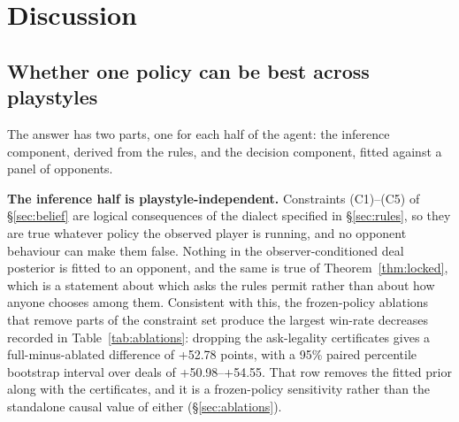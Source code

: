 \documentclass[11pt]{article}
\theoremstyle{definition}
\newcommand{\numAblSinkhorn}{+52.78}
\newcommand{\numAblSinkhornCI}{+50.98--+54.55}
\begin{document}
\renewcommand{\topfraction}{0.7}
\renewcommand{\bottomfraction}{0.3}
\renewcommand{\textfraction}{0.2}
\renewcommand{\floatpagefraction}{0.5}
\setcounter{topnumber}{2}
\setcounter{bottomnumber}{1}
\setcounter{totalnumber}{3}
\setlength{\textfloatsep}{20pt plus 2pt minus 4pt}
\setlength{\floatsep}{12pt plus 2pt minus 2pt}
\setlength{\intextsep}{12pt plus 2pt minus 2pt}
\section{Discussion}
\label{sec:discussion}

\subsection{Whether one policy can be best across playstyles}

The answer has two parts, one for each half of the agent: the inference
component, derived from the rules, and the decision component, fitted against a
panel of opponents.

\textbf{The inference half is playstyle-independent.} Constraints (C1)--(C5) of
\S\ref{sec:belief} are logical consequences of the dialect specified in
\S\ref{sec:rules}, so they are true whatever policy the observed player is
running, and no opponent behaviour can make them false. Nothing in the
observer-conditioned deal posterior is fitted to an opponent, and the same is true
of Theorem~\ref{thm:locked}, which is a statement about which asks the rules
permit rather than about how anyone chooses among them. Consistent with this, the
frozen-policy ablations that remove parts of the constraint set produce the
largest win-rate decreases recorded in Table~\ref{tab:ablations}: dropping the
ask-legality certificates gives a full-minus-ablated difference of
\numAblSinkhorn{} points, with a 95\% paired percentile bootstrap interval over
deals of \numAblSinkhornCI{}. That row removes the fitted prior along with the
certificates, and it is a frozen-policy sensitivity rather than the standalone
causal value of either (\S\ref{sec:ablations}).
\end{document}
